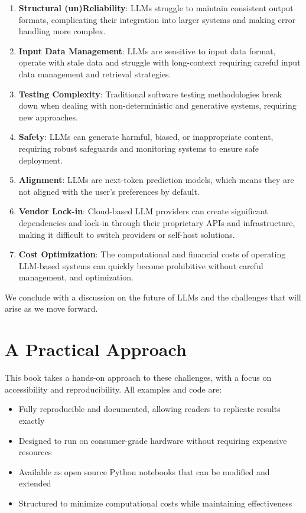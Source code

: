 \begin{enumerate}
    \item \textbf{Structural (un)Reliability}: LLMs struggle to maintain consistent output formats, complicating their integration into larger systems and making error handling more complex.

    \item \textbf{Input Data Management}: LLMs are sensitive to input data format, operate with stale data and struggle with long-context requiring careful input data management and retrieval strategies.

    \item \textbf{Testing Complexity}: Traditional software testing methodologies break down when dealing with non-deterministic and generative systems, requiring new approaches.

    \item \textbf{Safety}: LLMs can generate harmful, biased, or inappropriate content, requiring robust safeguards and monitoring systems to ensure safe deployment.

    \item \textbf{Alignment}: LLMs are next-token prediction models, which means they are not aligned with the user's preferences by default.

    \item \textbf{Vendor Lock-in}: Cloud-based LLM providers can create significant dependencies and lock-in through their proprietary APIs and infrastructure, making it difficult to switch providers or self-host solutions.

    \item \textbf{Cost Optimization}: The computational and financial costs of operating LLM-based systems can quickly become prohibitive without careful management, and optimization.
\end{enumerate}

We conclude with a discussion on the future of LLMs and the challenges that will arise as we move forward.

\section{A Practical Approach}

This book takes a hands-on approach to these challenges, with a focus on accessibility and reproducibility. 
All examples and code are:

\begin{itemize}
    \item Fully reproducible and documented, allowing readers to replicate results exactly
    \item Designed to run on consumer-grade hardware without requiring expensive resources
    \item Available as open source Python notebooks that can be modified and extended
    \item Structured to minimize computational costs while maintaining effectiveness
\end{itemize}

